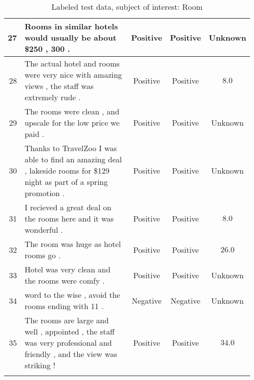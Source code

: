 \begin{landscape}
\begin{center}
\begin{longtable}{rm{9cm}ccc}
27 & Rooms in similar hotels would usually be about \$250 , 300 .
& Positive & Positive & Unknown \\ \hline
28 & The actual hotel and rooms were very nice with amazing views , the staff was extremely rude .
& Positive & Positive & $8.0$ \\ \hline
29 & The rooms were clean , and upscale for the low price we paid .
& Positive & Positive & Unknown \\ \hline
30 & Thanks to TravelZoo I was able to find an amazing deal , lakeside rooms for \$129 night as part of a spring promotion .
& Positive & Positive & Unknown \\ \hline
31 & I recieved a great deal on the rooms here and it was wonderful .
& Positive & Positive & $8.0$ \\ \hline
32 & The room was huge as hotel rooms go .
& Positive & Positive & $26.0$ \\ \hline
33 &Hotel was very clean and the rooms were comfy .
& Positive & Positive & Unknown \\ \hline
34 & word to the wise , avoid the rooms ending with 11 .
& Negative & Negative & Unknown \\ \hline
35 & The rooms are large and well , appointed , the staff was very professional and friendly , and the view was striking ! 
& Positive & Positive & $34.0$\\
\caption{Labeled test data, subject of interest: Room}
\label{table:labeling}
\end{longtable}
\end{center}
\end{landscape}

